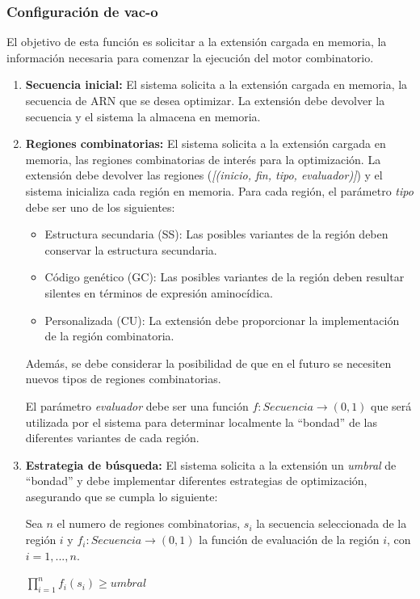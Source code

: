 \documentclass[10pt,a4paper]{article}
\begin{document}
  \subsubsection{Configuraci\'on de vac-o}
  El objetivo de esta funci\'on es solicitar a la extensi\'on cargada en
memoria, la informaci\'on necesaria para comenzar la ejecuci\'on del motor
combinatorio.
  \begin{enumerate}
    \item \textbf{Secuencia inicial:}
    El sistema solicita a la extensi\'on cargada en memoria, la secuencia de ARN
que se desea optimizar. La extensi\'on debe devolver la secuencia y el sistema
la almacena en memoria. 
    
    \item \textbf{Regiones combinatorias:}
    El sistema solicita a la extensi\'on cargada en memoria, las regiones
combinatorias de inter\'es para la optimizaci\'on. La extensi\'on debe devolver
las regiones (\textit{[(inicio, fin, tipo, evaluador)]}) y el sistema inicializa
cada regi\'on en memoria. Para cada regi\'on, el par\'ametro \textit{tipo} debe
ser uno de los siguientes:
    \begin{itemize}
      \item Estructura secundaria (SS): Las posibles variantes de la regi\'on
deben conservar la estructura secundaria.
      \item C\'odigo gen\'etico (GC): Las posibles variantes de la regi\'on
deben resultar silentes en t\'erminos de expresi\'on aminoc\'idica.
      \item Personalizada (CU): La extensi\'on debe proporcionar la
implementaci\'on de la regi\'on combinatoria.
    \end{itemize}

    Adem\'as, se debe considerar la posibilidad de que en el futuro se necesiten
nuevos tipos de regiones combinatorias.

    El par\'ametro \textit{evaluador} debe ser una funci\'on $f: Secuencia
\rightarrow (0,1)$ que ser\'a utilizada por el sistema para determinar
localmente la ``bondad'' de las diferentes variantes de cada regi\'on.

    \item \textbf{Estrategia de b\'usqueda:}
    El sistema solicita a la extensi\'on un \textit{umbral} de ``bondad'' y debe
implementar diferentes estrategias de optimizaci\'on, asegurando que se cumpla
lo siguiente:

    Sea $n$ el numero de regiones combinatorias, $s_{i}$ la secuencia
seleccionada de la regi\'on $i$ y $f_{i}: Secuencia \rightarrow (0,1)$ la
funci\'on de evaluaci\'on de la regi\'on $i$, con $i=1, ..., n$.
    \begin{center}
    $\prod_{i=1}^{n} f_{i}(s_{i}) \ge umbral$
    \end{center}


\end{enumerate}
\end{document}
